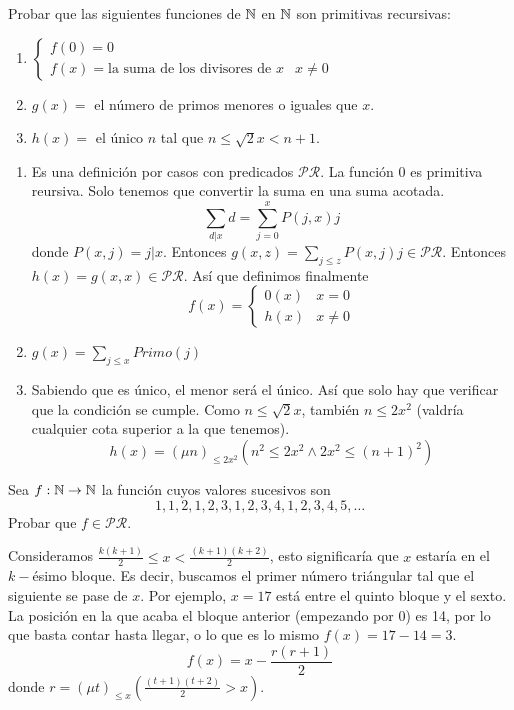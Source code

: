 \documentclass[twoside]{article}
\begin{document}
\begin{ejercicio}{8}
Probar que las siguientes funciones de $\mathbb{N}$ en $\mathbb{N}$ son primitivas recursivas:
\begin{enumerate}
\item $\begin{cases}
f(0)=0\\
f(x) =\text{la suma de los divisores de } x & x\neq 0
\end{cases}$
\item $g(x)=$ el número de primos menores o iguales que $x$.
\item $h(x)=$ el único $n$ tal que $n\leq\sqrt{2}x<n+1$.
\end{enumerate}
\end{ejercicio}
\begin{solucion}
\begin{enumerate}
\item Es una definición por casos con predicados $\mathcal{PR}$. La función 0 es primitiva reursiva. Solo tenemos que convertir la suma en una suma acotada. 
$$\sum_{d|x}d=\sum_{j=0}^xP(j,x)j$$
donde $P(x,j)=j|x$. Entonces $g(x,z)=\sum_{j\leq z}P(x,j)j\in\mathcal{PR}$. Entonces $h(x)=g(x,x)\in\mathcal{PR}$. Así que definimos finalmente
$$f(x)=\begin{cases}
0(x) & x=0\\
h(x) & x\neq 0
\end{cases}$$
\item $g(x)=\sum_{j\leq x}Primo(j)$
\item Sabiendo que es único, el menor será el único. Así que solo hay que verificar que la condición se cumple. Como $n\leq\sqrt{2}x$, también $n\leq 2x^2$ (valdría cualquier cota superior a la que tenemos).
$$h(x)=(\mu n)_{\leq 2x^2}(n^2\leq 2x^2\land 2x^2\leq (n+1)^2)$$
\end{enumerate}
\end{solucion}

\newpage

\begin{ejercicio}{9}
Sea $f : \mathbb{N} \to \mathbb{N}$ la función cuyos valores sucesivos son
$$1, 1, 2, 1, 2, 3, 1, 2, 3, 4, 1, 2, 3, 4, 5, \dots$$
Probar que $f \in \mathcal{PR}$.
\end{ejercicio}
\begin{solucion}
Consideramos $\frac{k(k+1)}{2}\leq x < \frac{(k+1)(k+2)}{2}$, esto significaría que $x$ estaría en el $k-$ésimo bloque. Es decir, buscamos el primer número triángular tal que el siguiente se pase de $x$. Por ejemplo, $x=17$ está entre el quinto bloque y el sexto. La posición en la que acaba el bloque anterior (empezando por 0) es 14, por lo que basta contar hasta llegar, o lo que es lo mismo $f(x)=17-14=3$.
$$f(x)=x-\frac{r(r+1)}{2}$$
donde $r=(\mu t)_{\leq x}\left(\frac{(t+1)(t+2)}{2}>x\right)$. 
\end{solucion}
\end{document}
